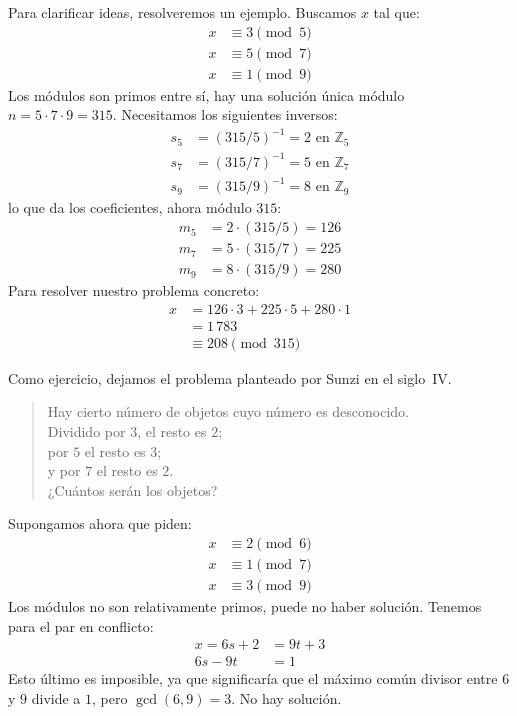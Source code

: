   Para clarificar ideas,
  resolveremos un ejemplo.
  Buscamos \(x\) tal que:
  \begin{align*}
    x &\equiv 3 \pmod{5} \\
    x &\equiv 5 \pmod{7} \\
    x &\equiv 1 \pmod{9}
  \end{align*}
  Los módulos son primos entre sí,
  hay una solución única
  módulo \(n = 5 \cdot 7 \cdot 9 = 315\).
  Necesitamos los siguientes inversos:
  \begin{align*}
    s_5
      &= (315 / 5)^{-1} = 2 \text{\ en\ } \mathbb{Z}_5 \\
    s_7
      &= (315 / 7)^{-1} = 5 \text{\ en\ } \mathbb{Z}_7 \\
    s_9
      &= (315 / 9)^{-1} = 8 \text{\ en\ } \mathbb{Z}_9
  \end{align*}
  lo que da los coeficientes,
  ahora módulo \(315\):
  \begin{align*}
    m_5
      &= 2 \cdot (315 / 5) = 126 \\
    m_7
      &= 5 \cdot (315 / 7) = 225 \\
    m_9
      &= 8 \cdot (315 / 9) = 280
  \end{align*}
  Para resolver nuestro problema concreto:
  \begin{align*}
    x &= 126 \cdot 3 + 225 \cdot 5 + 280 \cdot 1 \\
      &= 1\,783 \\
      &\equiv 208 \pmod{315}
  \end{align*}

  Como ejercicio,
  dejamos el problema planteado por Sunzi%
  en el siglo~IV.
  \begin{verse}
    Hay cierto número de objetos cuyo número es desconocido. \\
    Dividido por \(3\), el resto es \(2\); \\
    por \(5\) el resto es \(3\); \\
    y por \(7\) el resto es \(2\). \\
    ¿Cuántos serán los objetos?
  \end{verse}

  Supongamos ahora que piden:
  \begin{align*}
    x &\equiv 2 \pmod{6} \\
    x &\equiv 1 \pmod{7} \\
    x &\equiv 3 \pmod{9}
  \end{align*}
  Los módulos no son relativamente primos,
  puede no haber solución.
  Tenemos para el par en conflicto:
  \begin{align*}
    x = 6 s + 2	  &= 9 t + 3 \\
	6 s - 9 t &= 1
  \end{align*}
  Esto último es imposible,
  ya que significaría
  que el máximo común divisor entre \(6\) y \(9\)
  divide a \(1\),
  pero \(\gcd(6, 9) = 3\).
  No hay solución.

